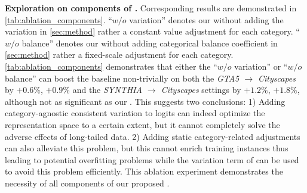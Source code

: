 \noindent \textbf{Exploration on components of \method.} Corresponding results are demonstrated in \cref{tab:ablation_components}.
%
``$\textit{w/o}$ variation'' denotes our \method without adding the variation in \cref{sec:method} rather a constant value adjustment for each category.
%
``$\textit{w/o}$ balance'' denotes our \method without adding categorical balance coefficient in \cref{sec:method} rather a fixed-scale adjustment for each category.
%
\cref{tab:ablation_components} demonstrates that either the ``$\textit{w/o}$ variation'' or ``$\textit{w/o}$ balance'' can boost the baseline non-trivially on both the \textit{GTA5 $\to$ Cityscapes} by $+0.6\%$, $+0.9\%$ and the \textit{SYNTHIA $\to$ Cityscapes} settings by $+1.2\%$, $+1.8\%$, although not as significant as our \method.
%
This suggests two conclusions: 
% 
1) Adding category-agnostic consistent variation to logits can indeed optimize the representation space to a certain extent, but it cannot completely solve the adverse effects of long-tailed data.
%
2) Adding static category-related adjustments can also alleviate this problem, but this cannot enrich training instances thus leading to potential overfitting problems while the variation term of \method can be used to avoid this problem efficiently.
%
This ablation experiment demonstrates the necessity of all components of our proposed \method.



%





